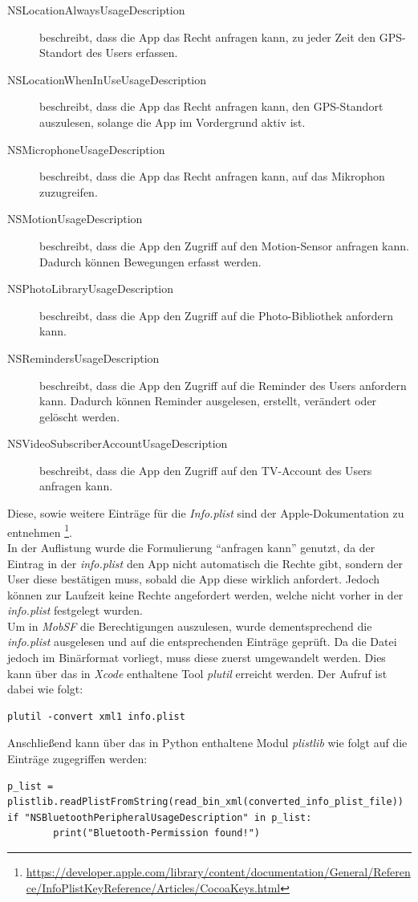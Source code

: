 \begin{description}
	\item[NSLocationAlwaysUsageDescription] beschreibt, dass die App das Recht anfragen kann, zu jeder Zeit den GPS-Standort des Users erfassen.
	
	\item[NSLocationWhenInUseUsageDescription] beschreibt, dass die App das Recht anfragen kann, den GPS-Standort auszulesen, solange die App im Vordergrund aktiv ist.
	
	\item[NSMicrophoneUsageDescription] beschreibt, dass die App das Recht anfragen kann, auf das Mikrophon zuzugreifen. 
	
	\item[NSMotionUsageDescription] beschreibt, dass die App den Zugriff auf den Motion-Sensor anfragen kann. Dadurch können Bewegungen erfasst werden.
	
	\item[NSPhotoLibraryUsageDescription] beschreibt, dass die App den Zugriff auf die Photo-Bibliothek anfordern kann.
	
	\item[NSRemindersUsageDescription] beschreibt, dass die App den Zugriff auf die Reminder des Users anfordern kann. Dadurch können Reminder ausgelesen, erstellt, verändert oder gelöscht werden.
	
	\item[NSVideoSubscriberAccountUsageDescription] beschreibt, dass die App den Zugriff auf den TV-Account des Users anfragen kann.
\end{description}

Diese, sowie weitere Einträge für die \textit{Info.plist} sind der Apple-Dokumentation zu entnehmen \footnote{\url{https://developer.apple.com/library/content/documentation/General/Reference/InfoPlistKeyReference/Articles/CocoaKeys.html}}.\\

In der Auflistung wurde die Formulierung "`anfragen kann"' genutzt, da der Eintrag in der \textit{info.plist} den App nicht automatisch die Rechte gibt, sondern der User diese bestätigen muss, sobald die App diese wirklich anfordert. Jedoch können zur Laufzeit keine Rechte angefordert werden, welche nicht vorher in der \textit{info.plist} festgelegt wurden.\\

Um in \textit{MobSF} die Berechtigungen auszulesen, wurde dementsprechend die \textit{info.plist} ausgelesen und auf die entsprechenden Einträge geprüft. Da die Datei jedoch im Binärformat vorliegt, muss diese zuerst umgewandelt werden. Dies kann über das in \textit{Xcode} enthaltene Tool \textit{plutil} erreicht werden. Der Aufruf ist dabei wie folgt:
\begin{lstlisting}
plutil -convert xml1 info.plist
\end{lstlisting}
Anschließend kann über das in Python enthaltene Modul \textit{plistlib} wie folgt auf die Einträge zugegriffen werden:
\begin{lstlisting}
p_list = plistlib.readPlistFromString(read_bin_xml(converted_info_plist_file))
if "NSBluetoothPeripheralUsageDescription" in p_list:
        print("Bluetooth-Permission found!")
\end{lstlisting}

